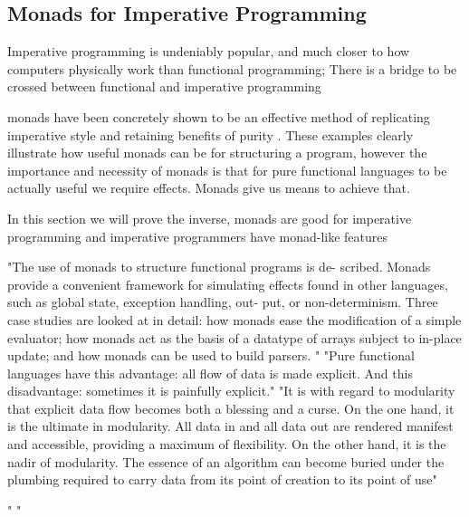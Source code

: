 \documentclass[a4paper,10pt]{article}
\theoremstyle{definition}
\begin{document}
\subsection{Monads for Imperative Programming}
Imperative programming is undeniably popular,
and much closer to how computers physically work than functional programming;
There is a bridge to be crossed between functional and imperative programming

monads have been concretely shown to be an effective method of replicating
imperative style and retaining benefits of purity \cite{PeytonJones:1993}.
These examples clearly illustrate how useful monads can be for structuring a program,
however the importance and necessity of monads is that for pure functional languages
to be actually useful we require effects. Monads give us means to achieve that.

In this section we will prove the inverse,
monads are good for imperative programming
and imperative programmers have monad-like features





"The use of monads to structure functional programs is de- scribed. Monads provide a convenient framework for simulating effects found in other languages, such as global state, exception handling, out- put, or non-determinism. Three case studies are looked at in detail: how monads ease the modification of a simple evaluator; how monads act as the basis of a datatype of arrays subject to in-place update; and how monads can be used to build parsers.
"
"Pure functional languages have this advantage: all flow of data is made explicit. And this disadvantage: sometimes it is painfully explicit."
"It is with regard to modularity that explicit data flow becomes both a blessing and a curse. On the one hand, it is the ultimate in modularity. All data in and all data out are rendered manifest and accessible, providing a maximum of flexibility. On the other hand, it is the nadir of modularity. The essence of an algorithm can become buried under the plumbing required to carry data from its point of creation to its point of use"
\cite{wadler1995monads}

"
"\cite{PeytonJones:1993}
\end{document}
